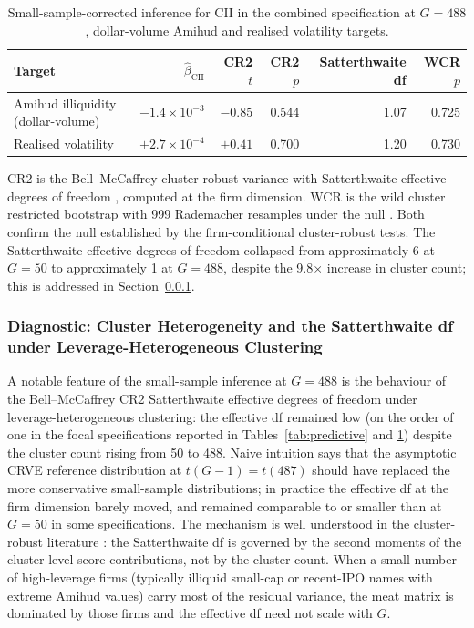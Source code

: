\documentclass[preprint,12pt,authoryear]{elsarticle}
\begin{document}
\begin{table}[H]
\centering
\begin{threeparttable}
\caption{Small-sample-corrected inference for CII in the combined specification at $G = 488$, dollar-volume Amihud and realised volatility targets.}
\label{tab:horserace_smallsample}
\begin{tabular}{lrrrrr}
\toprule
Target & $\hat{\beta}_{\mathrm{CII}}$ & CR2 $t$ & CR2 $p$ & Satterthwaite df & WCR $p$ \\
\midrule
Amihud illiquidity (dollar-volume) & $-1.4 \times 10^{-3}$ & $-0.85$ & 0.544 & 1.07 & 0.725 \\
Realised volatility & $+2.7 \times 10^{-4}$ & $+0.41$ & 0.700 & 1.20 & 0.730 \\
\bottomrule
\end{tabular}
\begin{tablenotes}
\small
\item CR2 is the Bell--McCaffrey cluster-robust variance with Satterthwaite effective degrees of freedom \citep{imbens2016robust}, computed at the firm dimension. WCR is the wild cluster restricted bootstrap with 999 Rademacher resamples under the null \citep{cameron2008bootstrap, mackinnon2017wild}. Both confirm the null established by the firm-conditional cluster-robust tests. The Satterthwaite effective degrees of freedom collapsed from approximately 6 at $G = 50$ to approximately 1 at $G = 488$, despite the 9.8\(\times\) increase in cluster count; this is addressed in Section~\ref{sec:cluster_heterogeneity}.
\end{tablenotes}
\end{threeparttable}
\end{table}

\subsubsection{Diagnostic: Cluster Heterogeneity and the Satterthwaite df under Leverage-Heterogeneous Clustering}
\label{sec:cluster_heterogeneity}

A notable feature of the small-sample inference at $G = 488$ is the behaviour of the Bell--McCaffrey CR2 Satterthwaite effective degrees of freedom under leverage-heterogeneous clustering: the effective df remained low (on the order of one in the focal specifications reported in Tables~\ref{tab:predictive} and \ref{tab:horserace_smallsample}) despite the cluster count rising from 50 to 488. Naive intuition says that the asymptotic CRVE reference distribution at $t(G - 1) = t(487)$ should have replaced the more conservative small-sample distributions; in practice the effective df at the firm dimension barely moved, and remained comparable to or smaller than at $G = 50$ in some specifications. The mechanism is well understood in the cluster-robust literature \citep{imbens2016robust}: the Satterthwaite df is governed by the second moments of the cluster-level score contributions, not by the cluster count. When a small number of high-leverage firms (typically illiquid small-cap or recent-IPO names with extreme Amihud values) carry most of the residual variance, the meat matrix is dominated by those firms and the effective df need not scale with $G$.
\end{document}
